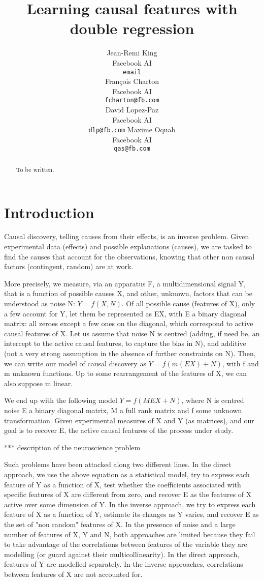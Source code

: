 \documentclass{article}
\title{Learning causal features with double regression}
\author{%
  Jean-Remi King\\
  Facebook AI\\
  \texttt{email} \\
  \And
  Fran\c{c}ois Charton\\
  Facebook AI\\
  \texttt{fcharton@fb.com}\\
  \And
  David Lopez-Paz\\
  Facebook AI\\
  \texttt{dlp@fb.com}
  \And
  Maxime Oquab\\
  Facebook AI\\
  \texttt{qas@fb.com}
}
\begin{document}
\maketitle

\begin{abstract}
    To be written.
\end{abstract}

\section{Introduction}


Causal discovery, telling causes from their effects, is an inverse problem.
%
Given experimental data (effects) and possible explanations (causes), we are tasked to find the causes that account for the observations, knowing that other non causal factors (contingent, random) are at work.

More precisely, we measure, via an apparatus F, a multidimensional signal Y, that is a function of possible causes X, and other, unknown, factors that can be understood as noise N: $Y=f(X,N)$.
%
Of all possible cause (features of X), only a few account for Y, let them be represented as EX, with E a binary diagonal matrix: all zeroes except a few ones on the diagonal, which correspond to active causal features of X.
%
Let us assume that noise N is centred (adding, if need be, an intercept to the active causal features, to capture the bias in N), and additive (not a very strong assumption in the absence of further constraints on N).
%
Then, we can write our model of causal discovery as $Y=f(m(EX)+N)$, with f and m unknown functions.
%
Up to some rearrangement of the features of X, we can also suppose m linear.

We end up with the following model $Y=f(MEX+N)$, where N is centred noise E a binary diagonal matrix, M a full rank matrix and f some unknown transformation.
%
Given experimental measures of X and Y (as matrices), and our goal is to recover E, the active causal features of the process under study.

*** description of the neuroscience problem

Such problems have been attacked along two different lines.
%
In the direct approach, we use the above equation as a statistical model, try to express each feature of Y as a function of X, test whether the coefficients associated with specific features of X are different from zero, and recover E as the features of X active over some dimension of Y.
%
In the inverse approach, we try to express each feature of X as a function of Y, estimate its changes as Y varies, and recover E as the set of "non random" features of X.
%
In the presence of noise and a large number of features of X, Y and N, both approaches are limited because they fail to take advantage of the correlations between features of the variable they are modelling (or guard against their multicollinearity).
%
In the direct approach, features of Y are modelled separately.
%
In the inverse approaches, correlations between features of X are not accounted for.
\end{document}
